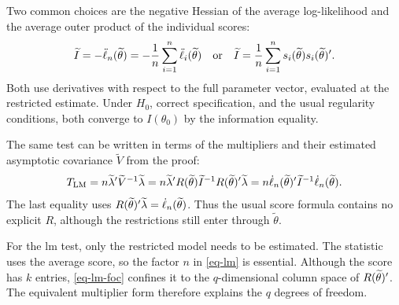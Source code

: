 \documentclass[a4paper,12pt]{article}
\begin{document}
\begin{remark}
	Two common choices are the negative Hessian of the average log-likelihood and the average outer product of the individual scores:
	\begin{align*}
		\widetilde I
		= -\ddot\ell_n(\widetilde\theta)
		= -\frac1n\sum_{i=1}^n \ddot\ell_i(\widetilde\theta)
		\quad\text{or}\quad
		\widetilde I
		= \frac1n\sum_{i=1}^n s_i(\widetilde\theta)s_i(\widetilde\theta)^{\prime}.
	\end{align*}
	Both use derivatives with respect to the full parameter vector, evaluated at the restricted estimate.
	Under $H_0$, correct specification, and the usual regularity conditions, both converge to $I(\theta_0)$ by the information equality.
\end{remark}

\begin{remark}
	The same test can be written in terms of the multipliers and their estimated asymptotic covariance $\widetilde V$ from the proof:
	\begin{align*}
		T_{\mathrm{LM}}
		=n\widetilde\lambda^{\prime}\widetilde V^{-1}\widetilde\lambda
		=n\widetilde\lambda^{\prime} R(\widetilde\theta)\widetilde I^{-1} R(\widetilde\theta)^{\prime}\widetilde\lambda
		=n\dot\ell_n(\widetilde\theta)^{\prime}\widetilde I^{-1}\dot\ell_n(\widetilde\theta).
	\end{align*}
	The last equality uses $R(\widetilde\theta)^{\prime}\widetilde\lambda=\dot\ell_n(\widetilde\theta)$.
	Thus the usual score formula contains no explicit $R$, although the restrictions still enter through $\widetilde\theta$.
\end{remark}

\begin{remark}
	For the \gls{lm} test,
	only the restricted model needs to be estimated.
	The statistic uses the average score, so the factor $n$ in \eqref{eq-lm} is essential.
	Although the score has $k$ entries, \eqref{eq-lm-foc} confines it to the $q$-dimensional column space of $R(\widetilde\theta)^{\prime}$.
	The equivalent multiplier form therefore explains the $q$ degrees of freedom.
\end{remark}
\end{document}

